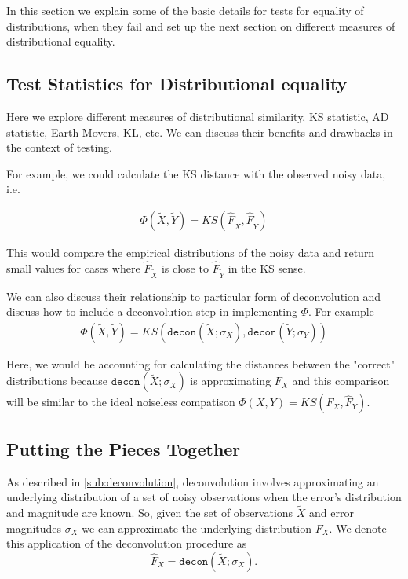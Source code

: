 \documentclass[12pt]{article}
\newcommand{\Xtilde}{\tilde{X}}
\newcommand{\Ytilde}{\tilde{Y}}
\newcommand{\decon}{\mathtt{decon}}
\newcommand{\Fhat}{\hat{F}}
\begin{document}
In this section we explain some of the basic details for tests for equality of distributions, when they fail and set up the next section on different measures of distributional equality. 



\subsection{Test Statistics for Distributional equality} %
\label{sub:test_statistics_for_distributional_equality}

Here we explore different measures of distributional similarity, KS statistic, AD statistic, Earth Movers, KL, etc. We can discuss their benefits and drawbacks in the context of testing. 

For example, we could calculate the KS distance with the observed noisy data, i.e. 

\begin{align*}
    \Phi(\tilde{X}, \tilde{Y}) = KS(\hat{F}_{\tilde{X}}, \hat{F}_{\tilde{Y}})
\end{align*}

This would compare the empirical distributions of the noisy data and return small values for cases where $\hat{F}_{\tilde{X}}$ is close to $\hat{F}_{\tilde{Y}}$ in the KS sense. 

We can also discuss their relationship to particular form of deconvolution and discuss how to include a deconvolution step in implementing $\Phi$. For example 
\begin{align*}
\Phi(\tilde{X}, \tilde{Y}) = KS(\decon(\Xtilde; \sigma_X), \decon(\Ytilde; \sigma_Y))    
\end{align*}

Here, we would be accounting for calculating the distances between the "correct" distributions because $\decon(\Xtilde; \sigma_X)$ is approximating $F_X$ and this comparison will be similar to the ideal noiseless compatison $\Phi(X, Y) = KS(\hat{F}_X, \hat{F}_Y)$. 



\subsection{Putting the Pieces Together} %
\label{sub:putting_the_pieces_together}

As described in \autoref{sub:deconvolution}, deconvolution involves approximating an underlying distribution of a set of noisy observations when the error's distribution and magnitude are known. So, given the set of observations $\Xtilde$ and error magnitudes $\sigma_X$ we can approximate the underlying distribution $F_X$. We denote this application of the deconvolution procedure as
\begin{equation}
\Fhat_X = \decon(\Xtilde; \sigma_X).
\end{equation}
\end{document}
